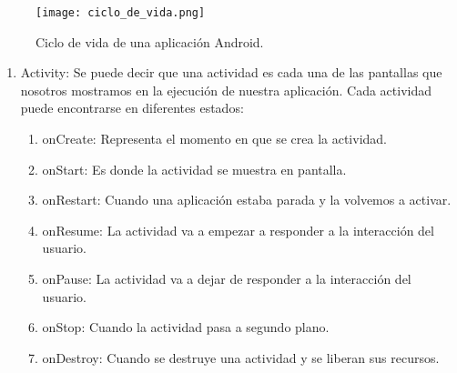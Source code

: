 \begin{figure}[h]
\texttt{[image: ciclo\_de\_vida.png]} 
\caption{Ciclo de vida de una aplicación Android.}
\end{figure}
\begin{enumerate}

\item	Activity: Se puede decir que una actividad es cada una de
 las pantallas que nosotros mostramos en la ejecución de nuestra 
aplicación. Cada actividad puede encontrarse en diferentes estados:
\begin{enumerate}
\item	onCreate: Representa el momento en que se crea la actividad.
\item	onStart: Es donde la actividad se muestra en pantalla.
\item	onRestart: Cuando una aplicación estaba parada y la volvemos a activar.
\item	onResume: La actividad va a empezar a responder a la interacción del usuario.
\item	onPause: La actividad va a dejar de responder a la interacción del usuario.
\item	onStop: Cuando la actividad pasa a segundo plano.
\item	onDestroy: Cuando se destruye una actividad y se liberan sus recursos.
\end{enumerate}





\end{enumerate}
